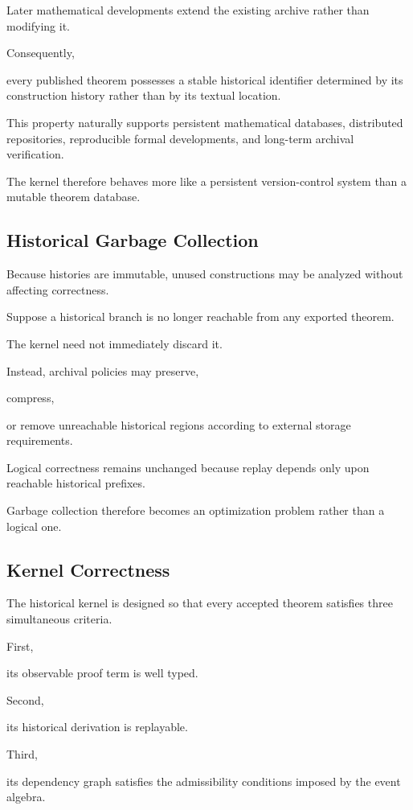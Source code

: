 \documentclass[12pt,oneside]{article}
\theoremstyle{definition}
\theoremstyle{remark}
\begin{document}
Later mathematical developments extend the existing archive rather than
modifying it.

Consequently,

every published theorem possesses a stable historical identifier determined by
its construction history rather than by its textual location.

This property naturally supports persistent mathematical databases, distributed
repositories, reproducible formal developments, and long-term archival
verification.

The kernel therefore behaves more like a persistent version-control system than
a mutable theorem database.

\subsection{Historical Garbage Collection}

Because histories are immutable, unused constructions may be analyzed without
affecting correctness.

Suppose a historical branch is no longer reachable from any exported theorem.

The kernel need not immediately discard it.

Instead, archival policies may preserve,

compress,

or remove unreachable historical regions according to external storage
requirements.

Logical correctness remains unchanged because replay depends only upon reachable
historical prefixes.

Garbage collection therefore becomes an optimization problem rather than a
logical one.

\subsection{Kernel Correctness}

The historical kernel is designed so that every accepted theorem satisfies three
simultaneous criteria.

First,

its observable proof term is well typed.

Second,

its historical derivation is replayable.

Third,

its dependency graph satisfies the admissibility conditions imposed by the event
algebra.
\end{document}
